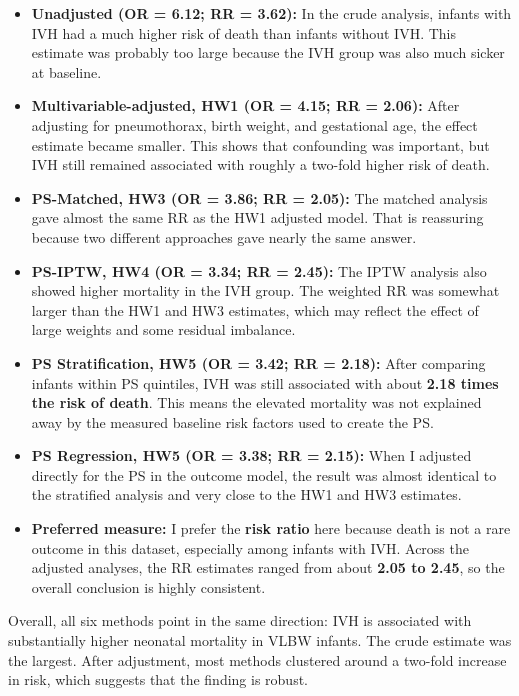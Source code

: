 \documentclass[
]{article}
\begin{document}
\begin{itemize}
\item
  \textbf{Unadjusted (OR = 6.12; RR = 3.62):} In the crude analysis,
  infants with IVH had a much higher risk of death than infants without
  IVH. This estimate was probably too large because the IVH group was
  also much sicker at baseline.
\item
  \textbf{Multivariable-adjusted, HW1 (OR = 4.15; RR = 2.06):} After
  adjusting for pneumothorax, birth weight, and gestational age, the
  effect estimate became smaller. This shows that confounding was
  important, but IVH still remained associated with roughly a two-fold
  higher risk of death.
\item
  \textbf{PS-Matched, HW3 (OR = 3.86; RR = 2.05):} The matched analysis
  gave almost the same RR as the HW1 adjusted model. That is reassuring
  because two different approaches gave nearly the same answer.
\item
  \textbf{PS-IPTW, HW4 (OR = 3.34; RR = 2.45):} The IPTW analysis also
  showed higher mortality in the IVH group. The weighted RR was somewhat
  larger than the HW1 and HW3 estimates, which may reflect the effect of
  large weights and some residual imbalance.
\item
  \textbf{PS Stratification, HW5 (OR = 3.42; RR = 2.18):} After
  comparing infants within PS quintiles, IVH was still associated with
  about \textbf{2.18 times the risk of death}. This means the elevated
  mortality was not explained away by the measured baseline risk factors
  used to create the PS.
\item
  \textbf{PS Regression, HW5 (OR = 3.38; RR = 2.15):} When I adjusted
  directly for the PS in the outcome model, the result was almost
  identical to the stratified analysis and very close to the HW1 and HW3
  estimates.
\item
  \textbf{Preferred measure:} I prefer the \textbf{risk ratio} here
  because death is not a rare outcome in this dataset, especially among
  infants with IVH. Across the adjusted analyses, the RR estimates
  ranged from about \textbf{2.05 to 2.45}, so the overall conclusion is
  highly consistent.
\end{itemize}

Overall, all six methods point in the same direction: IVH is associated
with substantially higher neonatal mortality in VLBW infants. The crude
estimate was the largest. After adjustment, most methods clustered
around a two-fold increase in risk, which suggests that the finding is
robust.
\end{document}
